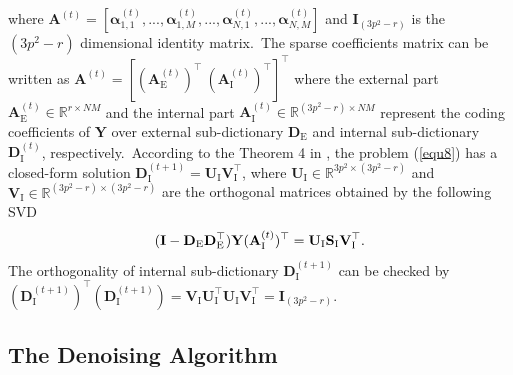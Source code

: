 \documentclass[10pt,twocolumn,letterpaper]{article}
\begin{document}
where $\textbf{A}^{(t)}=[\bm{\alpha}_{1,1}^{(t)},...,\bm{\alpha}_{1,M}^{(t)},...,\bm{\alpha}_{N,1}^{(t)},...,\bm{\alpha}_{N,M}^{(t)}]$ and $\mathbf{I}_{(3p^2-r)}$ is the $(3p^2-r)$ dimensional identity matrix.\ The sparse coefficients matrix can be written as $\mathbf{A}^{(t)}=[(\mathbf{A}_{\text{E}}^{(t)})^{\top}\ (\mathbf{A}_{\text{I}}^{(t)})^{\top}]^{\top}$ where the external part $\mathbf{A}_{\text{E}}^{(t)}\in\mathbb{R}^{r\times NM}$ and the internal part $\mathbf{A}_{\text{I}}^{(t)}\in\mathbb{R}^{(3p^2-r)\times NM}$ represent the coding coefficients of $\mathbf{Y}$ over external sub-dictionary $\mathbf{D}_{\text{E}}$ and internal sub-dictionary $\mathbf{D}_{\text{I}}^{(t)}$, respectively.\ According to the Theorem 4 in \cite{spca}, the problem (\ref{equ8}) has a closed-form solution $\mathbf{D}_{\text{I}}^{(t+1)}=\mathbf{U}_{\text{I}}\mathbf{V}_{\text{I}}^{\top}$, where $\mathbf{U}_{\text{I}}\in\mathbb{R}^{3p^2\times (3p^2-r)}$ and $\mathbf{V}_{\text{I}}\in\mathbb{R}^{(3p^2-r)\times (3p^2-r)}$ are the orthogonal matrices obtained by the following SVD
\vspace{-2mm}
\begin{equation}\label{equ9}\vspace{-2mm}
(\mathbf{I}-\mathbf{D}_{\text{E}}\mathbf{D}_{\text{E}}^{\top})\mathbf{Y}(\mathbf{A}_{\text{I}}^{(t)})^{\top}
=
\mathbf{U}_{\text{I}}\mathbf{S}_{\text{I}}\mathbf{V}_{\text{I}}^{\top}.
\end{equation}
The orthogonality of internal sub-dictionary $\mathbf{D}_{\text{I}}^{(t+1)}$ can be checked by 
$(\mathbf{D}_{\text{I}}^{(t+1)})^{\top}(\mathbf{D}_{\text{I}}^{(t+1)})=\mathbf{V}_{\text{I}}\mathbf{U}_{\text{I}}^{\top}\mathbf{U}_{\text{I}}\mathbf{V}_{\text{I}}^{\top}=\mathbf{I}_{(3p^2-r)}$.

\subsection{The Denoising Algorithm}
\end{document}
